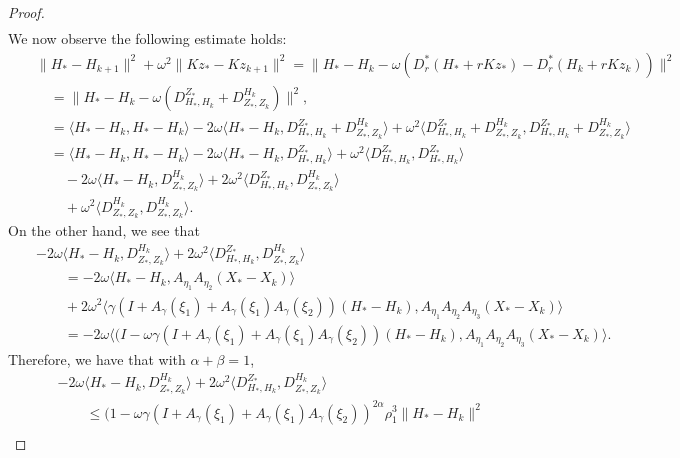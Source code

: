 \begin{proof}
\begin{eqnarray*}
\end{eqnarray*}
We now observe the following estimate holds: 
\begin{eqnarray*}
&& \|H_* - H_{k+1}\|^2 + \omega^2 \|Kz_{*} - Kz_{k+1}\|^2 = \|H_* - H_k - \omega (D_r^{*} (H_* + r K z_*) - D_r^{*} (H_k + r K z_k))\|^2 \\ 
&& \quad = \|H_* - H_k - \omega (D_{H_*,H_k}^{Z_*} + D_{Z_*,Z_k}^{H_k})\|^2,  \\
&& \quad = \langle H_* - H_k, H_* - H_k \rangle - 2 \omega \langle H_* - H_k, D_{H_*,H_k}^{Z_*} + D_{Z_*,Z_k}^{H_k} \rangle + \omega^2 \langle  D_{H_*,H_k}^{Z_*} + D_{Z_*,Z_k}^{H_k},  D_{H_*,H_k}^{Z_*} + D_{Z_*,Z_k}^{H_k}\rangle \\ 
&& \quad = \langle H_* - H_k, H_* - H_k \rangle - 2 \omega \langle H_* - H_k, D_{H_*,H_k}^{Z_*} \rangle + \omega^2 \langle D_{H_*,H_k}^{Z_*}, D_{H_*,H_k}^{Z_*}\rangle \\ 
&& \qquad - 2 \omega \langle H_* - H_k, D_{Z_*,Z_k}^{H_k} \rangle + 2 \omega^2 \langle  
D_{H_*,H_k}^{Z_*}, D_{Z_*,Z_k}^{H_k} \rangle \\
&& \qquad + \omega^2 \langle D_{Z_*,Z_k}^{H_k},  D_{Z_*,Z_k}^{H_k} \rangle. 
\end{eqnarray*}
On the other hand, we see that 
\begin{eqnarray*}
&& -2\omega \langle H_* - H_k, D_{Z_*,Z_k}^{H_k} \rangle + 2\omega^2 \langle D_{H_*,H_k}^{Z_*}, D_{Z_*,Z_k}^{H_k}  \rangle \\
&& \qquad = -2\omega \langle H_* - H_k, A_{\eta_1} A_{\eta_2} (X_*  - X_k) \rangle \\ 
&& \qquad + 2 \omega^2 \langle \gamma (I + A_\gamma (\xi_1) + A_\gamma (\xi_1)A_\gamma(\xi_2)) (H_* - H_k), A_{\eta_1} A_{\eta_2} A_{\eta_3} (X_*  - X_k)  \rangle \\
&& \qquad = - 2\omega \langle (I - \omega \gamma (I + A_\gamma(\xi_1) + A_\gamma (\xi_1)A_\gamma(\xi_2))(H_* - H_k), A_{\eta_1} A_{\eta_2} A_{\eta_3} (X_*  - X_k) \rangle. 
\end{eqnarray*}
Therefore, we have that with $\alpha + \beta = 1$, 
\begin{eqnarray*}
&& -2\omega \langle H_* - H_k, D_{Z_*,Z_k}^{H_k} \rangle + 2\omega^2 \langle D_{H_*,H_k}^{Z_*}, D_{Z_*,Z_k}^{H_k}  \rangle \\
&& \qquad \leq (1 - \omega \gamma (I + A_\gamma(\xi_1) + A_\gamma (\xi_1)A_\gamma(\xi_2))^{2\alpha} \rho_1^3 \|H_* - H_k\|^2 \\

\end{eqnarray*}
\end{proof}
